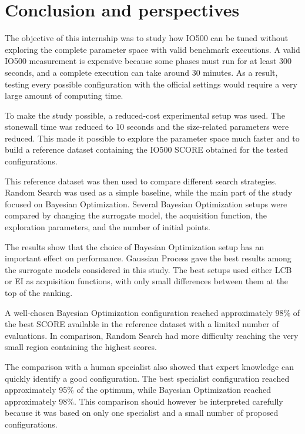 \section{Conclusion and perspectives}
\label{sec:conclusion}



The objective of this internship was to study how IO500 can be tuned
without exploring the complete parameter space with valid benchmark
executions. A valid IO500 measurement is expensive because some phases
must run for at least 300 seconds, and a complete execution can take
around 30 minutes. As a result, testing every possible configuration with
the official settings would require a very large amount of computing
time.

To make the study possible, a reduced-cost experimental setup was used.
The stonewall time was reduced to 10 seconds and the size-related
parameters were reduced. This made it possible to explore the parameter
space much faster and to build a reference dataset containing the IO500
SCORE obtained for the tested configurations.

This reference dataset was then used to compare different search
strategies. Random Search was used as a simple baseline, while the main
part of the study focused on Bayesian Optimization. Several Bayesian
Optimization setups were compared by changing the surrogate model, the
acquisition function, the exploration parameters, and the number of
initial points.

The results show that the choice of Bayesian Optimization setup has an
important effect on performance. Gaussian Process gave the best results
among the surrogate models considered in this study. The best setups used
either LCB or EI as acquisition functions, with only small differences
between them at the top of the ranking.

A well-chosen Bayesian Optimization configuration reached approximately
98\% of the best SCORE available in the reference dataset with a limited
number of evaluations. In comparison, Random Search had more difficulty
reaching the very small region containing the highest scores.

The comparison with a human specialist also showed that expert knowledge
can quickly identify a good configuration. The best specialist
configuration reached approximately 95\% of the optimum, while Bayesian
Optimization reached approximately 98\%. This comparison should however
be interpreted carefully because it was based on only one specialist and
a small number of proposed configurations.

